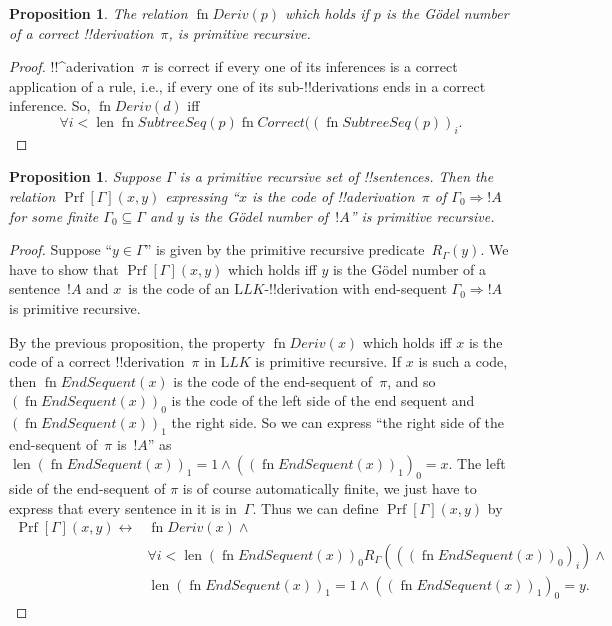 \documentclass[10pt,a4paper]{article}
\theoremstyle{plain}
\newtheorem{prop}[thm]{Proposition}
\theoremstyle{definition}
\theoremstyle{remark}
\newcommand*{\ollabel}[1]{\label{#1}}
\providecommand{\Sequent}{\mathrel{\Rightarrow}}
\providecommand{\Log}{\ensuremath{\mathrm{L}}}
\providecommand{\len}{\operatorname{len}}
\providecommand{\Prf}{\operatorname{Prf}}
\providecommand{\bforall}{\forall}
\providecommand{\defiff}{\mathrel{\leftrightarrow}}
\providecommand{\fn}{\operatorname{fn}}
\begin{document}
\begin{prop}
  \ollabel{prop:deriv}
  The relation $\fn{Deriv}(p)$ which holds if $p$ is the G\"odel
  number of a correct !!{derivation}~$\pi$, is primitive recursive.
\end{prop}

\begin{proof}
  !!^a{derivation}~$\pi$ is correct if every one of its inferences
  is a correct application of a rule, i.e., if every one of its
  sub-!!{derivation}s ends in a correct inference. So, $\fn{Deriv}(d)$
  iff
  \[
  \bforall{i<\len{\fn{SubtreeSeq}(p)}}{\fn{Correct}((\fn{SubtreeSeq}(p))_i}.
  \]
\end{proof}


\begin{prop}
Suppose $\Gamma$ is a primitive recursive set of !!{sentence}s.  Then
the relation $\Prf[\Gamma](x, y)$ expressing ``$x$ is the code of
!!a{derivation}~$\pi$ of $\Gamma_0 \Sequent !A$ for some finite
$\Gamma_0 \subseteq \Gamma$ and $y$ is the G\"odel number of~$!A$'' is
primitive recursive.
\end{prop}

\begin{proof}
Suppose ``$y \in \Gamma$'' is given by the primitive recursive
predicate~$R_\Gamma(y)$.  We have to show that $\Prf[\Gamma](x, y)$
which holds iff $y$ is the G\"odel number of a sentence~$!A$ and
$x$~is the code of an $\Log{LK}$-!!{derivation} with end-sequent
$\Gamma_0 \Sequent !A$ is primitive recursive.

By the previous proposition, the property $\fn{Deriv}(x)$ which holds
iff $x$ is the code of a correct !!{derivation}~$\pi$ in $\Log{LK}$ is
primitive recursive.  If $x$ is such a code, then $\fn{EndSequent}(x)$
is the code of the end-sequent of~$\pi$, and so
$(\fn{EndSequent}(x))_0$ is the code of the left side of the end
sequent and $(\fn{EndSequent}(x))_1$ the right side.  So we can
express ``the right side of the end-sequent of~$\pi$ is~$!A$'' as
$\len{(\fn{EndSequent}(x))_1} = 1 \land ((\fn{EndSequent}(x))_1)_0 =
x$.  The left side of the end-sequent of $\pi$ is of course
automatically finite, we just have to express that every sentence in
it is in~$\Gamma$.  Thus we can define $\Prf[\Gamma](x, y)$ by
\begin{align*}
\Prf[\Gamma](x, y) \defiff {}&
\fn{Deriv}(x) \land {} \\
& \bforall{i <
  \len{(\fn{EndSequent}(x))_0}}{R_\Gamma(((\fn{EndSequent}(x))_0)_i)} \land {}\\
& \len{(\fn{EndSequent}(x))_1} = 1 \land ((\fn{EndSequent}(x))_1)_0 = y.
\end{align*}
\end{proof}
\end{document}
